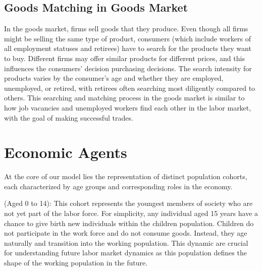 \documentclass[ %
    final,
    scrbook,
    listoffigures,
    listoftables, 
    glossary]{cu-thesis}
\begin{document}
\subsection{Goods Matching in Goods Market}
In the goods market, firms sell goods that they produce. Even though all firms might be selling the same type of product, consumers (which include workers of all employment statuses and retirees) have to search for the products they want to buy. Different firms may offer similar products for different prices, and this influences the consumers' decision purchasing decisions. The search intensity for products varies by the consumer's age and whether they are employed, unemployed, or retired, with retirees often searching most diligently compared to others. This searching and matching process in the goods market is similar to how job vacancies and unemployed workers find each other in the labor market, with the goal of making successful trades.

\iffalse
In the goods market, the production of goods and the transaction process of goods (that is, buying and selling goods) are also completely separated. There are many firms selling a homogeneous product in the market, and consumers choose their favorite products to trade with sellers, which is also a search-matching process. A firm-worker pair (i.e., the seller) first posts a price of the goods, which could be high or low compared with the average price in the market. Workers and retirees (i.e., buyers) start searching the market for sellers. The search intensity for goods varies according to age and employment status. Specifically, retirees are most likely to conduct two searches, while employed workers are least likely to do so. Unemployed workers exhibit a likelihood of conducting two searches that falls between that of retirees and employed workers.
\fi

\section{Economic Agents}
At the core of our model lies the representation of distinct population cohorts, each characterized by age groups and corresponding roles in the economy.

 (Aged 0 to 14): This cohort represents the youngest members of society who are not yet part of the labor force. 
For simplicity, any individual aged 15 years have a chance to give birth new individuals within the children population.
Children do not participate in the work force and do not consume goods. Instead, they age naturally and transition into the working population. This dynamic are crucial for understanding future labor market dynamics as this population defines the shape of the working population in the future.
\end{document}
